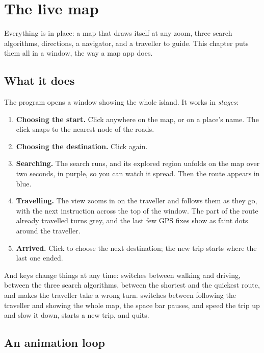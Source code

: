 \chapter{The live map}\label{ch:livemap}

Everything is in place: a map that draws itself at any zoom, three search
algorithms, directions, a navigator, and a traveller to guide. This
chapter puts them all in a window, the way a map app does.

\section{What it does}

The program opens a window showing the whole island. It works in
\emph{stages}:

\begin{enumerate}[nosep]
  \item \textbf{Choosing the start.} Click anywhere on the map, or on a
    place's name. The click snaps to the nearest node of the roads.
  \item \textbf{Choosing the destination.} Click again.
  \item \textbf{Searching.} The search runs, and its explored region
    unfolds on the map over two seconds, in purple, so you can watch it
    spread. Then the route appears in blue.
  \item \textbf{Travelling.} The view zooms in on the traveller and follows
    them as they go, with the next instruction across the top of the
    window. The part of the route already travelled turns grey, and the
    last few GPS fixes show as faint dots around the traveller.
  \item \textbf{Arrived.} Click to choose the next destination; the new
    trip starts where the last one ended.
\end{enumerate}

And keys change things at any time:  switches between walking and
driving,  between the three search algorithms,  between
the shortest and the quickest route, and  makes the traveller take
a wrong turn.  switches between following the traveller and
showing the whole map, the space bar pauses, \code{+} and \code{-} speed
the trip up and slow it down,  starts a new trip, and 
quits.

\section{An animation loop}

